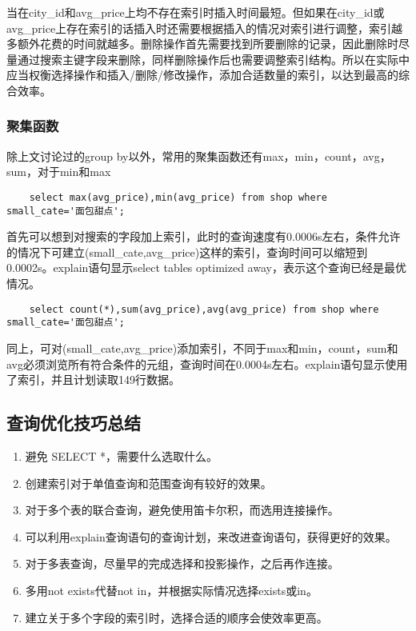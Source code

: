 \documentclass[a4paper, 11pt, nofonts, nocap, fancyhdr]{ctexart}
\begin{document}
当在city_id和avg_price上均不存在索引时插入时间最短。但如果在city_id或avg_price上存在索引的话插入时还需要根据插入的情况对索引进行调整，索引越多额外花费的时间就越多。删除操作首先需要找到所要删除的记录，因此删除时尽量通过搜索主键字段来删除，同样删除操作后也需要调整索引结构。所以在实际中应当权衡选择操作和插入/删除/修改操作，添加合适数量的索引，以达到最高的综合效率。

\subsubsection{聚集函数}
	
除上文讨论过的group by以外，常用的聚集函数还有max，min，count，avg，sum，对于min和max

	\begin{lstlisting}
	select max(avg_price),min(avg_price) from shop where small_cate='面包甜点';
	\end{lstlisting}

首先可以想到对搜索的字段加上索引，此时的查询速度有0.0006s左右，条件允许的情况下可建立(small_cate,avg_price)这样的索引，查询时间可以缩短到0.0002s。explain语句显示select tables optimized away，表示这个查询已经是最优情况。

	\begin{lstlisting}
	select count(*),sum(avg_price),avg(avg_price) from shop where small_cate='面包甜点';
	\end{lstlisting}

同上，可对(small_cate,avg_price)添加索引，不同于max和min，count，sum和avg必须浏览所有符合条件的元组，查询时间在0.0004s左右。explain语句显示使用了索引，并且计划读取149行数据。

\subsection{查询优化技巧总结}

\begin{enumerate}
	\item 避免 SELECT *，需要什么选取什么。
	\item 创建索引对于单值查询和范围查询有较好的效果。
	\item 对于多个表的联合查询，避免使用笛卡尔积，而选用连接操作。
	\item 可以利用explain查询语句的查询计划，来改进查询语句，获得更好的效果。
	\item 对于多表查询，尽量早的完成选择和投影操作，之后再作连接。
	\item 多用not exists代替not in，并根据实际情况选择exists或in。
	\item 建立关于多个字段的索引时，选择合适的顺序会使效率更高。
\end{enumerate}
\end{document}
